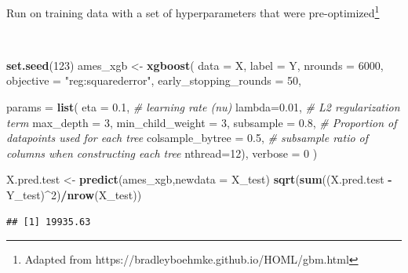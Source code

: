 \documentclass[
  10pt,
  ignorenonframetext,
]{beamer}
\newenvironment{Shaded}{\begin{snugshade}}{\end{snugshade}}
\newcommand{\AttributeTok}[1]{\textcolor[rgb]{0.13,0.29,0.53}{#1}}
\newcommand{\CommentTok}[1]{\textcolor[rgb]{0.56,0.35,0.01}{\textit{#1}}}
\newcommand{\DecValTok}[1]{\textcolor[rgb]{0.00,0.00,0.81}{#1}}
\newcommand{\FloatTok}[1]{\textcolor[rgb]{0.00,0.00,0.81}{#1}}
\newcommand{\FunctionTok}[1]{\textcolor[rgb]{0.13,0.29,0.53}{\textbf{#1}}}
\newcommand{\NormalTok}[1]{#1}
\newcommand{\OtherTok}[1]{\textcolor[rgb]{0.56,0.35,0.01}{#1}}
\newcommand{\SpecialCharTok}[1]{\textcolor[rgb]{0.81,0.36,0.00}{\textbf{#1}}}
\newcommand{\StringTok}[1]{\textcolor[rgb]{0.31,0.60,0.02}{#1}}
\begin{document}
\begin{frame}[fragile]
Run on training data with a set of hyperparameters that were
pre-optimized\footnote{Adapted from https://bradleyboehmke.github.io/HOML/gbm.html}

\(~\)

\scriptsize

\begin{Shaded}
\begin{Highlighting}[]
\FunctionTok{set.seed}\NormalTok{(}\DecValTok{123}\NormalTok{)}
\NormalTok{ames\_xgb }\OtherTok{\textless{}{-}} \FunctionTok{xgboost}\NormalTok{(}
  \AttributeTok{data =}\NormalTok{ X,}
  \AttributeTok{label =}\NormalTok{ Y,}
  \AttributeTok{nrounds =} \DecValTok{6000}\NormalTok{,}
  \AttributeTok{objective =} \StringTok{"reg:squarederror"}\NormalTok{,}
  \AttributeTok{early\_stopping\_rounds =} \DecValTok{50}\NormalTok{,   }
  
  \AttributeTok{params =} \FunctionTok{list}\NormalTok{( }
    \AttributeTok{eta =} \FloatTok{0.1}\NormalTok{, }\CommentTok{\# learning rate (nu)}
    \AttributeTok{lambda=}\FloatTok{0.01}\NormalTok{, }\CommentTok{\# L2 regularization term}
    \AttributeTok{max\_depth =} \DecValTok{3}\NormalTok{,}
    \AttributeTok{min\_child\_weight =} \DecValTok{3}\NormalTok{,}
    \AttributeTok{subsample =} \FloatTok{0.8}\NormalTok{, }\CommentTok{\# Proportion of datapoints used for each tree}
    \AttributeTok{colsample\_bytree =} \FloatTok{0.5}\NormalTok{, }\CommentTok{\# subsample ratio of columns when constructing each tree}
    \AttributeTok{nthread=}\DecValTok{12}\NormalTok{),}
  \AttributeTok{verbose =} \DecValTok{0}
\NormalTok{)  }
\end{Highlighting}
\end{Shaded}

\begin{Shaded}
\begin{Highlighting}[]
\NormalTok{X.pred.test }\OtherTok{\textless{}{-}} \FunctionTok{predict}\NormalTok{(ames\_xgb,}\AttributeTok{newdata =}\NormalTok{ X\_test)}
\FunctionTok{sqrt}\NormalTok{(}\FunctionTok{sum}\NormalTok{((X.pred.test }\SpecialCharTok{{-}}\NormalTok{ Y\_test)}\SpecialCharTok{\^{}}\DecValTok{2}\NormalTok{)}\SpecialCharTok{/}\FunctionTok{nrow}\NormalTok{(X\_test))}
\end{Highlighting}
\end{Shaded}

\begin{verbatim}
## [1] 19935.63
\end{verbatim}
\end{frame}
\end{document}
